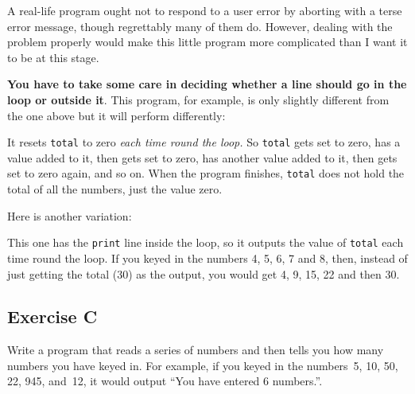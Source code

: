 A real-life program ought not to respond to a user error by aborting
with a terse error message, though regrettably many of them do.
However, dealing with the problem properly would make this little program
more complicated than I want it to be at this stage.

\textbf{You have to take some care in deciding whether a line should go in the
loop or outside it}.  This program, for example, is only slightly different
from the one above but it will perform differently:


It resets \texttt{total} to zero \emph{each time round the loop.}  So
\texttt{total} gets set to zero,
has a value added to it, then gets set to zero, has another value added to
it, then gets set to zero again, and so on.  When the program finishes,
\texttt{total} does not hold the total of all the numbers, just the value
zero.

Here is another variation:


This one has the \texttt{print} line inside the loop, so it outputs the value
of \texttt{total} each time round the loop.  If you keyed in the numbers
4, 5, 6, 7 and 8, then, instead of just getting the total (30) as the output,
you would get 4, 9, 15, 22 and then 30.

\subsection*{Exercise C}

Write a program that reads a series of numbers and then tells you how
many numbers you have keyed in.  For example, if you keyed in the
numbers~5, 10, 50, 22, 945, and~12, it would output ``You have entered 6
numbers.''.




